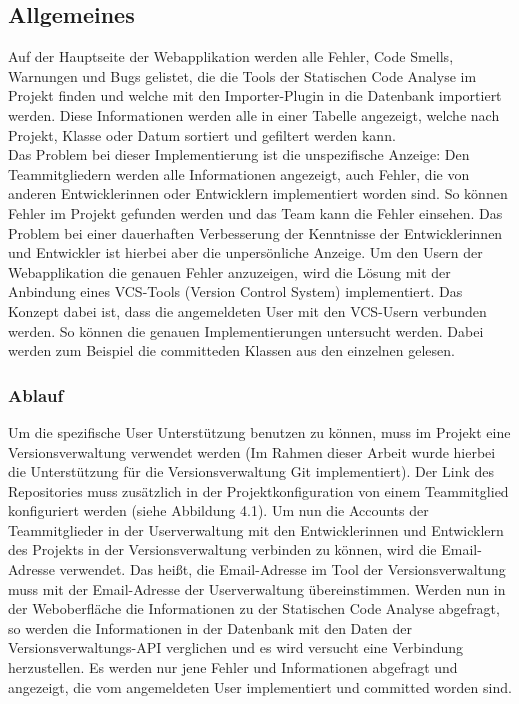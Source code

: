 \subsection{Allgemeines}
Auf der Hauptseite der Webapplikation werden alle Fehler, Code Smells, Warnungen und Bugs gelistet, die die Tools der Statischen Code Analyse im Projekt finden und welche mit den Importer-Plugin in die Datenbank importiert werden. Diese Informationen werden alle in einer Tabelle angezeigt, welche nach Projekt, Klasse oder Datum sortiert und gefiltert werden kann. \\
Das Problem bei dieser Implementierung ist die unspezifische Anzeige: Den Teammitgliedern werden alle Informationen angezeigt, auch Fehler, die von anderen Entwicklerinnen oder Entwicklern implementiert worden sind. So können  Fehler im Projekt gefunden werden und das Team kann die Fehler einsehen. Das Problem bei einer dauerhaften Verbesserung der Kenntnisse der Entwicklerinnen und Entwickler ist hierbei aber die unpersönliche Anzeige. Um den Usern der Webapplikation die genauen Fehler anzuzeigen, wird die Lösung mit der Anbindung eines VCS-Tools (Version Control System) implementiert. Das Konzept dabei ist, dass die angemeldeten User mit den VCS-Usern verbunden werden. So können die genauen Implementierungen untersucht werden. Dabei werden zum Beispiel die committeden Klassen aus den einzelnen gelesen.
\subsubsection{Ablauf}
Um die spezifische User Unterstützung benutzen zu können, muss im Projekt eine Versionsverwaltung verwendet werden (Im Rahmen dieser Arbeit wurde hierbei die Unterstützung für die Versionsverwaltung Git implementiert). Der Link des Repositories muss zusätzlich in der Projektkonfiguration von einem Teammitglied konfiguriert werden (siehe Abbildung 4.1). Um nun die Accounts der Teammitglieder in der Userverwaltung mit den Entwicklerinnen und Entwicklern des Projekts in der Versionsverwaltung verbinden zu können, wird die Email-Adresse verwendet. Das heißt, die Email-Adresse im Tool der Versionsverwaltung muss mit der Email-Adresse der Userverwaltung übereinstimmen. Werden nun in der Weboberfläche die Informationen zu der Statischen Code Analyse abgefragt, so werden die Informationen in der Datenbank mit den Daten der Versionsverwaltungs-API verglichen und es wird versucht eine Verbindung herzustellen. Es werden nur jene Fehler und Informationen abgefragt und angezeigt, die vom angemeldeten User implementiert und committed worden sind.   
